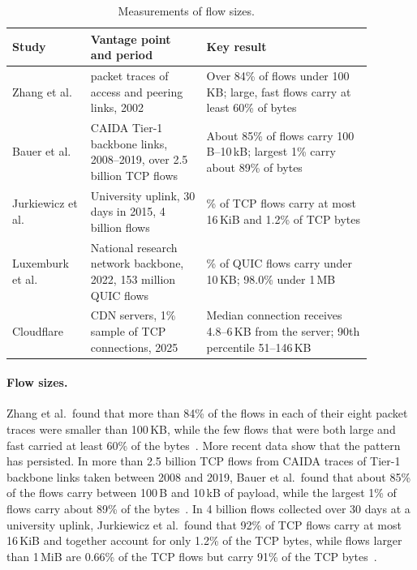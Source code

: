 \begin{table}[H]
  \centering
  \small
  \caption{Measurements of flow sizes.}
  \label{tab:bg-flow-sizes}
  \begin{tabular}{>{\raggedright\arraybackslash}p{0.19\linewidth}
                  >{\raggedright\arraybackslash}p{0.29\linewidth}
                  >{\raggedright\arraybackslash}p{0.40\linewidth}}
    \toprule
    Study & Vantage point and period & Key result \\
    \midrule
    Zhang et al.~\cite{zhang2002characteristics} & 8 packet traces of access and
      peering links, 2002 & Over 84\% of flows under 100\,KB; large, fast flows
      carry at least 60\% of bytes \\
    Bauer et al.~\cite{bauer2021evolution} & CAIDA Tier-1 backbone links,
      2008--2019, over 2.5 billion TCP flows & About 85\% of flows carry
      100\,B--10\,kB; largest 1\% carry about 89\% of bytes \\
    Jurkiewicz et al.~\cite{jurkiewicz2021flow} & University uplink, 30 days in
      2015, 4 billion flows & 92\% of TCP flows carry at most 16\,KiB and 1.2\% of
      TCP bytes \\
    Luxemburk et al.~\cite{luxemburk2023cesnet} & National research network
      backbone, 2022, 153 million QUIC flows & 47.5\% of QUIC flows carry under
      10\,KB; 98.0\% under 1\,MB \\
    Cloudflare~\cite{cloudflare2025connections} & CDN servers, 1\% sample of TCP
      connections, 2025 & Median connection receives 4.8--6\,KB from the server;
      90th percentile 51--146\,KB \\
    \bottomrule
  \end{tabular}
\end{table}

\paragraph{Flow sizes.} Zhang et al.\ found that more than 84\% of the flows in each
of their eight packet traces were smaller than 100\,KB, while the few flows that
were both large and fast carried at least 60\% of the
bytes~\cite{zhang2002characteristics}. More recent data show that the pattern
has persisted. In more than 2.5 billion TCP flows from CAIDA traces of Tier-1
backbone links taken between 2008 and 2019, Bauer et al.\ found that about 85\% of
the flows carry between 100\,B and 10\,kB of payload, while the largest 1\% of flows
carry about 89\% of the bytes~\cite{bauer2021evolution}. In 4 billion flows
collected over 30 days at a university uplink, Jurkiewicz et al.\ found that 92\% of
TCP flows carry at most 16\,KiB and together account for only 1.2\% of the TCP
bytes, while flows larger than 1\,MiB are 0.66\% of the TCP flows but carry 91\% of
the TCP bytes~\cite{jurkiewicz2021flow}.

